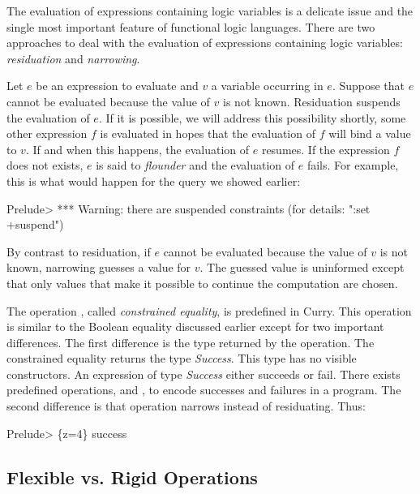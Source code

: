The evaluation of expressions containing logic variables
is a delicate issue and the single most important feature
of functional logic languages.
There are two approaches to deal with the evaluation of
expressions containing logic variables:
\emph{residuation} and
\emph{narrowing}.

Let $e$ be an expression to evaluate and $v$ a variable
occurring in $e$.
Suppose that $e$ cannot be evaluated because the value of
$v$ is not known.
Residuation suspends the evaluation of $e$.
If it is possible, we will address this possibility shortly,
some other expression $f$ is evaluated in hopes that the evaluation
of $f$ will bind a value to $v$.  If and when this happens,
the evaluation of $e$ resumes.
If the expression $f$ does not exists, $e$ is said to
\emph{flounder} and the evaluation of $e$
fails.
For example, this is what would happen for the query we showed
earlier:
%
\begin{prog}
Prelude> 
*** Warning: there are suspended constraints (for details: ":set +suspend")
\end{prog}
%
By contrast to residuation, 
if $e$ cannot be evaluated because the value of $v$ is not known,
narrowing guesses a value for $v$.
The guessed value is uninformed except that only values that
make it possible to continue the computation are chosen.

The operation \ccode{=:=},
called \emph{constrained equality},
is predefined in Curry.
This operation is similar to the Boolean equality
discussed earlier except for two important differences.
The first difference is the type returned by the operation.
The constrained equality returns the type \emph{Success}.
This type has no visible constructors.
An expression of type \emph{Success} either succeeds or fail.
There exists predefined operations,  and
, to encode successes and failures in a
program.
The second difference is that operation \ccode{=:=}
narrows instead of residuating.
Thus:
%
\begin{prog}
Prelude> 
\{z=4\} success
\end{prog}
%
\vspace*{-5ex}
\subsection{Flexible vs. Rigid Operations}

